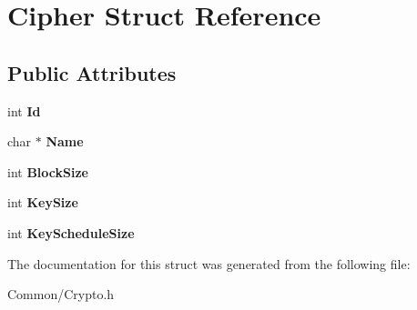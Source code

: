 \hypertarget{struct_cipher}{}\section{Cipher Struct Reference}
\label{struct_cipher}
\subsection*{Public Attributes}
\begin{DoxyCompactItemize}
\item 
\mbox{\label{struct_cipher_ad4fcfedebbd81899a3e4ecbce9be5749}} 
int {\bfseries Id}
\item 
\mbox{\label{struct_cipher_a15a06ac59d13525712f8414f69e14429}} 
char $\ast$ {\bfseries Name}
\item 
\mbox{\label{struct_cipher_a94b12a4b200461175462a2455415b69b}} 
int {\bfseries Block\+Size}
\item 
\mbox{\label{struct_cipher_ab6094c70a2359d745359ee8875f2f449}} 
int {\bfseries Key\+Size}
\item 
\mbox{\label{struct_cipher_abb81fc79cb7934b11fa4439e49c9e64e}} 
int {\bfseries Key\+Schedule\+Size}
\end{DoxyCompactItemize}


The documentation for this struct was generated from the following file\+:\begin{DoxyCompactItemize}
\item 
Common/Crypto.\+h\end{DoxyCompactItemize}
